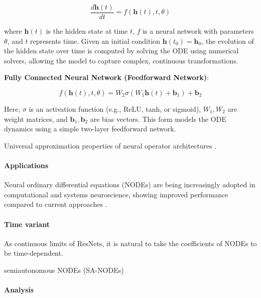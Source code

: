 \documentclass{article}
\theoremstyle{definition} \newtheorem{definition}{Definition}
\theoremstyle{remark} \newtheorem{remark}{Remark}
\newcounter{ct}
\begin{document}
\[
\frac{d \mathbf{h}(t)}{dt} = f(\mathbf{h}(t), t, \theta)
\]

where \( \mathbf{h}(t) \) is the hidden state at time \( t \), \( f \) is a neural network with parameters \( \theta \), and \( t \) represents time. Given an initial condition \( \mathbf{h}(t_0) = \mathbf{h}_0 \), the evolution of the hidden state over time is computed by solving the ODE using numerical solvers, allowing the model to capture complex, continuous transformations.

\textbf{Fully Connected Neural Network (Feedforward Network)}:

\[
f(\mathbf{h}(t), t, \theta) = W_2 \sigma(W_1 \mathbf{h}(t) + \mathbf{b}_1) + \mathbf{b}_2
\]

Here, \( \sigma \) is an activation function (e.g., ReLU, tanh, or sigmoid), \( W_1, W_2 \) are weight matrices, and \( \mathbf{b}_1, \mathbf{b}_2 \) are bias vectors.
 This form models the ODE dynamics using a simple two-layer feedforward network.

Universal approximation properties of neural operator architectures \citep{lu2021learning, kissas2022learning, kovachki2021universal}.


\paragraph{Applications}
Neural ordinary differential equations (NODEs) are being increasingly adopted in computational and systems neuroscience, showing improved performance compared to current approaches \citep{kim2021inferring,geenjaar2023learning,sedler2023expressive,elgazzar2024universal,rubanova2019latent,coelho2024enhancing}.



\paragraph{Time variant}
As continuous limits of ResNets, it is natural to take the coefficients of NODEs to be time-dependent.

semiautonomous NODEs (SA-NODEs) \citep{li2024universal}


\paragraph{Analysis}
\citep{massaroli2020nodes}
\end{document}
